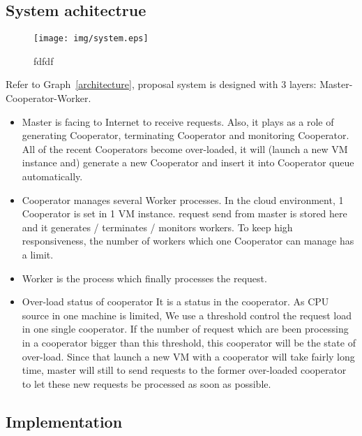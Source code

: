 \documentclass[JIP]{ipsj}
\begin{document}
\subsection{System achitectrue}

\begin{figure}[t]
	\texttt{[image: img/system.eps]}
	\caption{fdfdf} 
	\label{dfd} 
\end{figure}

Refer to Graph~\ref{architecture}, proposal system is designed with 3 layers: Master-Cooperator-Worker.
\begin{itemize}
\item Master is facing to Internet to receive requests. Also, it plays as a role of generating Cooperator, terminating Cooperator and monitoring Cooperator. All of the recent Cooperators become over-loaded, it will (launch a new VM instance and) generate a new Cooperator and insert it into Cooperator queue automatically.

\item Cooperator manages several Worker processes. In the cloud environment, 1 Cooperator is set in 1 VM instance.
request send from master is stored here and it generates / terminates / monitors workers. To keep high responsiveness, the number of workers which one Cooperator can manage has a limit.

\item Worker is the process which finally processes the request.

\item Over-load status of cooperator
It is a status in the cooperator. As CPU source in one machine is limited, We use a threshold control the request load in one single cooperator. If the number of request which are been processing in a cooperator bigger than this threshold, this cooperator will be the state of over-load. Since that launch a new VM with a cooperator will take fairly long time, master will still to send requests to the former over-loaded cooperator to let these new requests be processed as soon as possible.

\end{itemize}


\subsection{Implementation}
\end{document}
